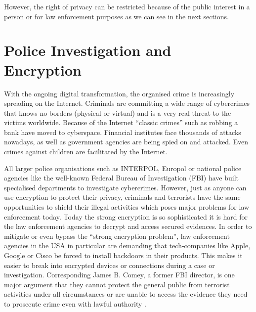 \documentclass[a4paper, 11pt]{article}
\begin{document}
However, the right of privacy can be restricted because of the public interest in a person or for law enforcement purposes as we can see in the next sections.
\section*{Police Investigation and Encryption}
With the ongoing digital transformation, the organised crime is increasingly spreading on the Internet.
Criminals are committing a wide range of cybercrimes that knows no borders (physical or virtual) and is a very real threat to the victims worldwide. Because of the Internet \enquote{classic crimes} such as robbing a bank have moved to cyberspace. Financial institutes face thousands of attacks nowadays, as well as government agencies are being spied on and attacked. Even crimes against children are facilitated by the Internet.
\par All larger police organisations such as INTERPOL, Europol or national police agencies like the well-known Federal Bureau of Investigation (FBI) have built specialised departments to investigate cybercrimes. However, just as anyone can use encryption to protect their privacy, criminals and terrorists have the same opportunities to shield their illegal activities which poses major problems for law enforcement today. Today the strong encryption is so sophisticated it is hard for the law enforcement agencies to decrypt and access secured evidences. In order to mitigate or even bypass the \enquote{strong encryption problem}, law enforcement agencies in the USA in particular are demanding that tech-companies like Apple, Google or Cisco be forced to install backdoors in their products. This makes it easier to break into encrypted devices or connections during a case or investigation. Corresponding James B. Comey, a former FBI director, is one major argument that they cannot protect the general public from terrorist activities under all circumstances or are unable to access the evidence they need to prosecute crime even with lawful authority \cite{COMEY}. 
\end{document}
